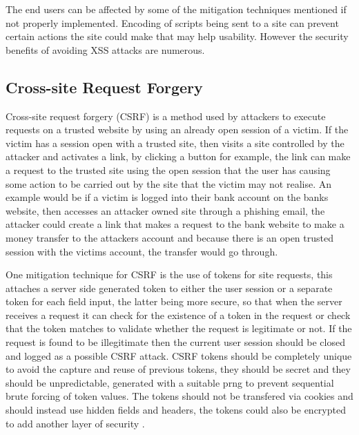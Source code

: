 \documentclass{ueacmpstyle}
\begin{document}
      The end users can be affected by some of the mitigation techniques mentioned if not 
      properly implemented. Encoding of scripts being sent to a site can prevent certain 
      actions the site could make that may help usability. However the security benefits 
      of avoiding XSS attacks are numerous.

      \subsection{Cross-site Request Forgery}\label{sub:CSRF}
      Cross-site request forgery (CSRF) is a method used by attackers to execute requests on 
      a trusted website by using an already open session of a victim. If the victim has a 
      session open with a trusted site, then visits a site controlled by the attacker and 
      activates a link, by clicking a button for example, the link can make a request to 
      the trusted site using the open session that the user has causing some action to be 
      carried out by the site that the victim may not realise. An example would be if a 
      victim is logged into their bank account on the banks website, then accesses an attacker 
      owned site through a phishing email, the attacker could create a link that makes a request
      to the bank website to make a money transfer to the attackers account and because there 
      is an open trusted session with the victims account, the transfer would go through.
      
      One mitigation technique for CSRF is the use of tokens for site requests, this attaches 
      a server side generated token to either the user session or a separate token for each 
      field input, the latter being more secure, so that when the server receives a request 
      it can check for the existence of a token in the request or check that the token matches 
      to validate whether the request is legitimate or not. If the request is found to be 
      illegitimate then the current user session should be closed and logged as a possible 
      CSRF attack. CSRF tokens should be completely unique to avoid the capture and reuse of 
      previous tokens, they should be secret and they should be unpredictable, generated with 
      a suitable prng to prevent sequential brute forcing of token values. The tokens should 
      not be transfered via cookies and should instead use hidden fields and headers, the 
      tokens could also be encrypted to add another layer of security \citep{OWASPCSRFPrevention}.
\end{document}
